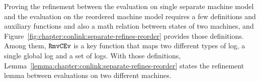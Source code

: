 Proving the refinement between the evaluation on single separate machine model and the 
evaluation on the reordered machine model 
requires a few definitions and auxiliary  functions and also a math relation between states of two machines,
and Figure~\ref{fig:chapter:conlink:separate-refines-reorder} provides those definitions. 
Among them, ${{\mathrm{\texttt{RmvCEv}}}}$ is a key function that maps two different types of log,
 a single global log and a set of logs. 
With those definitions, 
Lemma~\ref{lemma:chapter:conlink:separate-refines-reorder} states 
the refinement lemma between evaluations on two different machines.

%
%



